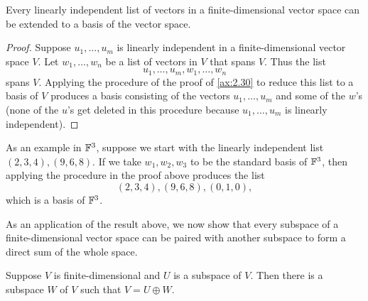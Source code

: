 \begin{result}\label{ax:2.32}
Every linearly independent list of vectors in a finite-dimensional vector space
can be extended to a basis of the vector space.
\end{result}

\begin{proof}
Suppose $u_1,\dots,u_m$ is linearly independent in a finite-dimensional vector
space $V$. Let $w_1,\dots,w_n$ be a list of vectors in $V$ that spans $V$. Thus
the list
\[ u_1,\dots,u_m,w_1,\dots,w_n \]
spans $V$. Applying the procedure of the proof of \ref{ax:2.30} to reduce this
list to a basis of $V$ produces a basis consisting of the vectors
$u_1,\dots,u_m$ and some of the $w$'s (none of the $u$'s get deleted in this
procedure because $u_1,\dots,u_m$ is linearly independent).
\end{proof}

As an example in $\mathbb{F}^3$, suppose we start with the linearly independent list
$(2,3,4),(9,6,8)$. If we take $w_1,w_2,w_3$ to be the standard basis of $\mathbb{F}^3$,
then applying the procedure in the proof above produces the list
\[ (2,3,4),(9,6,8),(0,1,0), \]
which is a basis of $\mathbb{F}^3$.

%
As an application of the result above, we now show that every subspace of a
finite-dimensional vector space can be paired with another subspace to form a
direct sum of the whole space.

\begin{result}\label{ax:2.33}
Suppose $V$ is finite-dimensional and $U$ is a subspace of $V$. Then there is a
subspace $W$ of $V$ such that $V=U\oplus W$.
\end{result}

